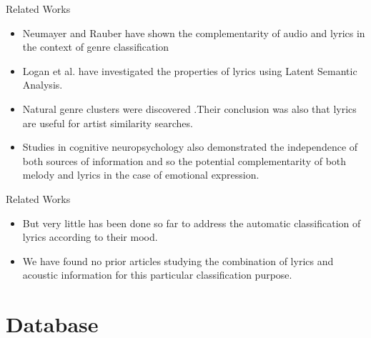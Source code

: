 \documentclass{beamer}
\begin{document}
\begin{frame}{Related Works}
  
  \begin{itemize}
  \item {
    Neumayer and Rauber have shown the complementarity of audio and lyrics in the context of genre classification
  } \pause
  \item {
    Logan et al. have investigated the properties of lyrics using Latent Semantic Analysis.
  } \pause
  
  \item {
    Natural genre clusters were discovered .Their conclusion was also that lyrics are useful for artist similarity searches.
    
  } \pause
  \item {
    Studies in cognitive neuropsychology also demonstrated the independence of both sources of information and so the potential complementarity of both melody and lyrics in the case of emotional expression.
  }
  
  \end{itemize}
\end{frame}

\begin{frame}{Related Works}
  
  \begin{itemize}
  \item {
    But very little has been done so far to address the automatic classification of lyrics according to their mood. 
  }
  
  \item {
    We have found no prior articles studying the combination of lyrics and acoustic information for this particular classification purpose.
  } 
  
  
  \end{itemize}
\end{frame}



\section{Database}
\end{document}
